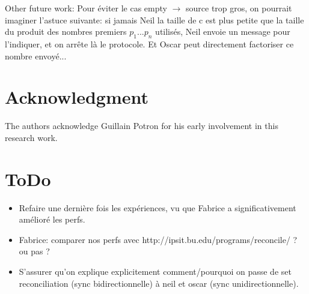 \documentclass[11pt]{llncs}
\begin{document}
Other future work: Pour éviter le cas empty $\rightarrow$ source trop gros, on pourrait imaginer l'astuce suivante: si jamais Neil la taille de c est plus petite que la taille du produit des nombres premiers $p_1$...$p_n$ utilisés, Neil envoie un message pour l'indiquer, et on arr\^ete là le protocole. Et Oscar peut directement factoriser ce nombre envoyé...

\section{Acknowledgment}

The authors acknowledge Guillain Potron for his early involvement in this research work.

\section{ToDo}

\begin{itemize}
\item Refaire une dernière fois les expériences, vu que Fabrice a significativement amélioré les perfs.
\item Fabrice: comparer nos perfs avec http://ipsit.bu.edu/programs/reconcile/ ? ou pas ?
\item S'assurer qu'on explique explicitement comment/pourquoi on passe de set
  reconciliation (sync bidirectionnelle) à neil et oscar (sync
  unidirectionnelle).
\end{itemize}

\nocite{rsync}
\nocite{wagner}
\end{document}
